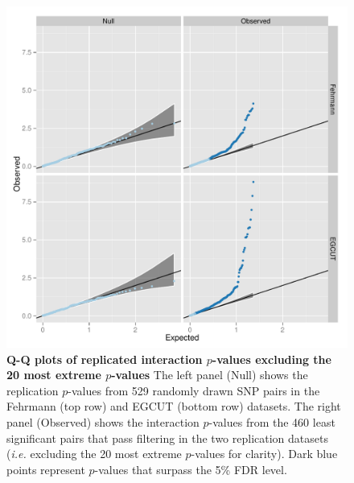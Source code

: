 \documentclass{article}
\begin{document}
\begin{figure}
	\includegraphics[width=5in]{qqfdr}
	\caption{\textbf{Q-Q plots of replicated interaction $p$-values excluding the 20 most extreme $p$-values} The left panel (Null) shows the replication $p$-values from 529 randomly drawn SNP pairs in the Fehrmann (top row) and EGCUT (bottom row) datasets. The right panel (Observed) shows the interaction $p$-values from the 460 least significant pairs that pass filtering in the two replication datasets (\emph{i.e.} excluding the 20 most extreme $p$-values for clarity). Dark blue points represent $p$-values that surpass the 5\% FDR level.}
\label{fig:qqplotfdr}
\end{figure}
\clearpage
\end{document}
